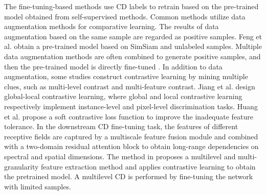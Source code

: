 \par The fine-tuning-based methods use CD labels to retrain based on the pre-trained model obtained from self-supervised methods. Common methods utilize data augmentation methods for comparative learning. The results of data augmentation based on the same sample are regarded as positive samples. Feng et al. \cite{feng2023detection} obtain a pre-trained model based on SimSiam and unlabeled samples. Multiple data augmentation methods are often combined to generate positive samples, and then the pre-trained model is directly fine-tuned \cite{ou2022hyperspectral} \cite{zou2023transformer}. In addition to data augmentation, some studies construct contrastive learning by mining multiple clues, such as multi-level contrast and multi-feature contrast. Jiang et al. \cite{jiang2023self} design global-local contrastive learning, where global and local contrastive learning respectively implement instance-level and pixel-level discrimination tasks. Huang et al. \cite{huang2023contrastive}  propose a soft contrastive loss function to improve the inadequate feature tolerance. In the downstream CD fine-tuning task, the features of different receptive fields are captured by a multiscale feature fusion module and combined with a two-domain residual attention block to obtain long-range dependencies on spectral and spatial dimensions. The method in \cite{wang2023self} proposes a multilevel and multi-granularity feature extraction method and applies contrastive learning to obtain the pretrained model. A multilevel CD is performed by fine-tuning the network with limited samples.


